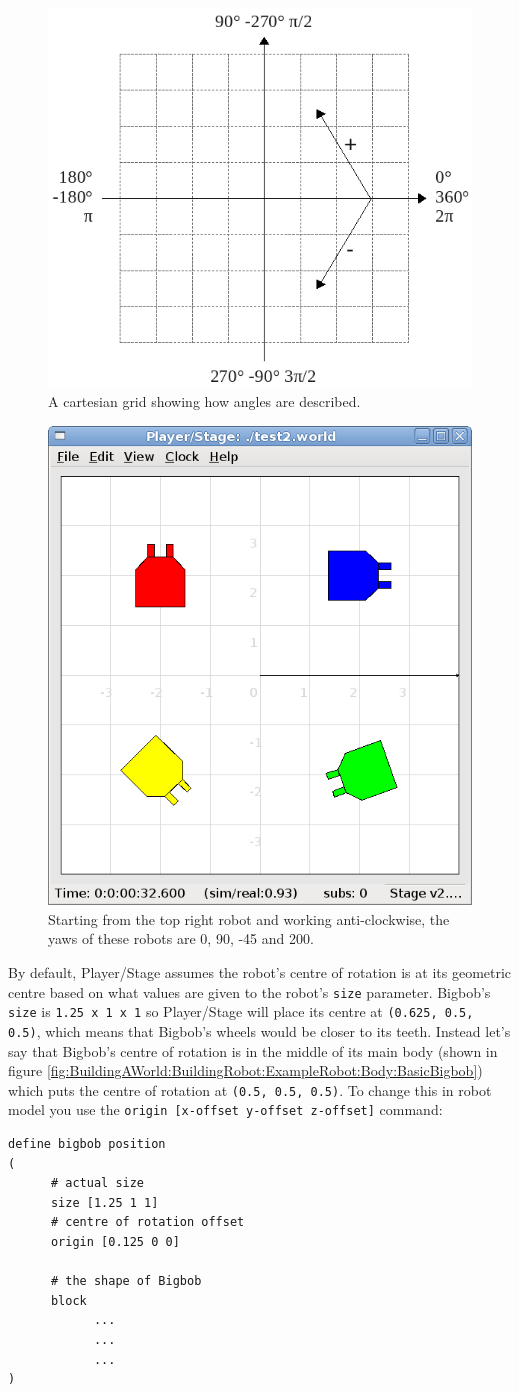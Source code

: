 \documentclass[a4paper]{report}
\newcommand{\plst}{Player/Stage\xspace}
\begin{document}
\begin{figure}
	\centering
	\includegraphics[width=0.5\linewidth]{./pics/robot_building/cartesian_grid_wpolars.png} 
	\caption{A cartesian grid showing how angles are described.}
	\label{fig:BuildingAWorld:BuildingRobot:ExampleRobot:Body:EmptyCartGrid}
\end{figure}

\begin{figure}
	\centering
	\includegraphics[width=0.6\linewidth]{./pics/robot_building/yaw_examples.png} 
	\caption{Starting from the top right robot and working anti-clockwise, the yaws of these robots are 0, 90, -45 and 200.}
	\label{fig:BuildingAWorld:BuildingRobot:ExampleRobot:Body:Yaws}
\end{figure}

By default, \plst assumes the robot's centre of rotation is at its geometric centre based on what values are given to the robot's \verb|size| parameter. Bigbob's \verb|size| is \verb|1.25 x 1 x 1| so \plst will place its centre at \verb|(0.625, 0.5, 0.5)|, which means that Bigbob's wheels would be closer to its teeth. Instead let's say that Bigbob's centre of rotation is in the middle of its main body (shown in figure \ref{fig:BuildingAWorld:BuildingRobot:ExampleRobot:Body:BasicBigbob}) which puts the centre of rotation at \verb|(0.5, 0.5, 0.5)|. To change this in robot model you use the \verb|origin [x-offset y-offset z-offset]| command:
\begin{verbatim}
define bigbob position
(
      # actual size
      size [1.25 1 1]
      # centre of rotation offset
      origin [0.125 0 0]

      # the shape of Bigbob
      block
            ...
            ...
            ...
)
\end{verbatim}
\end{document}
